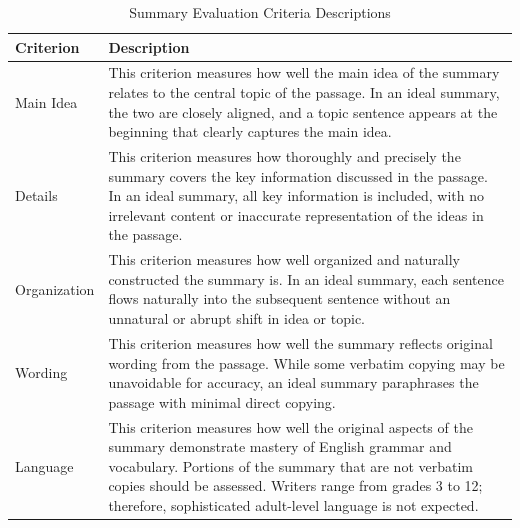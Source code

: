 \documentclass[letterpaper]{article} %
\begin{document}

\begin{table}[!h]
\centering
\renewcommand{\arraystretch}{1.4}
\begin{tabular}{|p{3.5cm}|p{10cm}|}
\hline
\textbf{Criterion} & \textbf{Description} \\
\hline
Main Idea &
This criterion measures how well the main idea of the summary relates to the central topic of the passage. In an ideal summary, the two are closely aligned, and a topic sentence appears at the beginning that clearly captures the main idea. \\
\hline
Details &
This criterion measures how thoroughly and precisely the summary covers the key information discussed in the passage. In an ideal summary, all key information is included, with no irrelevant content or inaccurate representation of the ideas in the passage. \\
\hline
Organization &
This criterion measures how well organized and naturally constructed the summary is. In an ideal summary, each sentence flows naturally into the subsequent sentence without an unnatural or abrupt shift in idea or topic. \\
\hline
Wording &
This criterion measures how well the summary reflects original wording from the passage. While some verbatim copying may be unavoidable for accuracy, an ideal summary paraphrases the passage with minimal direct copying. \\
\hline
Language &
This criterion measures how well the original aspects of the summary demonstrate mastery of English grammar and vocabulary. Portions of the summary that are not verbatim copies should be assessed. Writers range from grades 3 to 12; therefore, sophisticated adult-level language is not expected. \\
\hline
\end{tabular}
\caption{Summary Evaluation Criteria Descriptions}
\label{apx:criteria}
\end{table}
\end{document}
